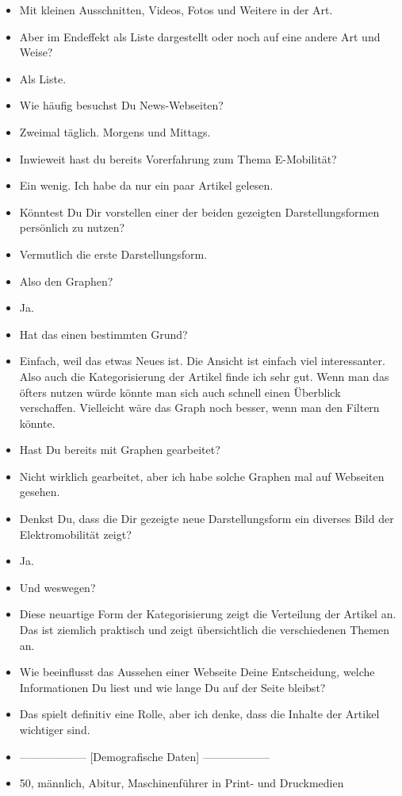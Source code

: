 {\begin{itemize}[]
        \item {} Mit kleinen Ausschnitten, Videos, Fotos und Weitere in der Art.
        \item {} Aber im Endeffekt als Liste dargestellt oder noch auf eine andere Art und Weise?
        \item {} Als Liste.
        \item {} Wie häufig besuchst Du News-Webseiten?
        \item {} Zweimal täglich. Morgens und Mittags.
        \item {} Inwieweit hast du bereits Vorerfahrung zum Thema E-Mobilität?
        \item {} Ein wenig. Ich habe da nur ein paar Artikel gelesen.
        \item {} Könntest Du Dir vorstellen einer der beiden gezeigten Darstellungsformen persönlich zu nutzen?
        \item {} Vermutlich die erste Darstellungsform.
        \item {} Also den Graphen?
        \item {} Ja.
        \item {} Hat das einen bestimmten Grund?
        \item {} Einfach, weil das etwas Neues ist.
              Die Ansicht ist einfach viel interessanter.
              Also auch die Kategorisierung der Artikel finde ich sehr gut.
              Wenn man das öfters nutzen würde könnte man sich auch schnell einen Überblick verschaffen.
              Vielleicht wäre das Graph noch besser, wenn man den Filtern könnte.
        \item {} Hast Du bereits mit Graphen gearbeitet?
        \item {} Nicht wirklich gearbeitet, aber ich habe solche Graphen mal auf Webseiten gesehen.
        \item {} Denkst Du, dass die Dir gezeigte neue Darstellungsform ein diverses Bild der Elektromobilität zeigt?
        \item {} Ja.
        \item {} Und weswegen?
        \item {} Diese neuartige Form der Kategorisierung zeigt die Verteilung der Artikel an.
              Das ist ziemlich praktisch und zeigt übersichtlich die verschiedenen Themen an.
        \item {} Wie beeinflusst das Aussehen einer Webseite Deine Entscheidung, welche Informationen Du liest und wie lange Du auf der Seite bleibst?
        \item {} Das spielt definitiv eine Rolle, aber ich denke, dass die Inhalte der Artikel wichtiger sind.
        \item {------------------} [Demografische Daten] {------------------}
        \item {} 50, männlich, Abitur, Maschinenführer in Print- und Druckmedien
    \end{itemize}}
\nolinenumbers
